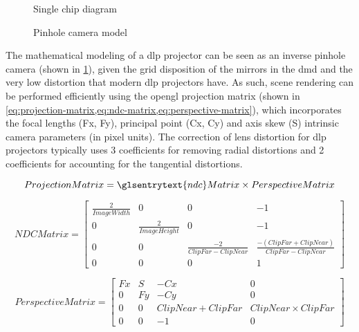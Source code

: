 \begin{figure}[H]
	\begin{floatrow}[2]
		{\caption[Single chip  diagram]{Single chip  diagram\protect\footnotemark}\label{fig:dlp-projector-diagram-dmd}}
		{\caption[Pinhole camera model]{Pinhole camera model\protect\footnotemark}\label{fig:camera-intrinsics}}
	\end{floatrow}
\end{figure}


The mathematical modeling of a \gls{dlp} projector can be seen as an inverse pinhole camera \cite{Hartley2003} (shown in \cref{fig:camera-intrinsics}), given the grid disposition of the mirrors in the \gls{dmd} and the very low distortion that modern \gls{dlp} projectors have. As such, scene rendering can be performed efficiently using the \gls{opengl} projection matrix (shown in \cref{eq:projection-matrix,eq:ndc-matrix,eq:perspective-matrix}), which incorporates the focal lengths (Fx, Fy), principal point (Cx, Cy) and axis skew (S) intrinsic camera parameters (in pixel units). The correction of lens distortion for \gls{dlp} projectors typically uses 3 coefficients for removing radial distortions and 2 coefficients for accounting for the tangential distortions.

{
	\scriptsize
	\begin{equation}\label{eq:projection-matrix}
	ProjectionMatrix = \glsentrytext{ndc}Matrix \times PerspectiveMatrix
	\end{equation}
	
	\begin{equation}\label{eq:ndc-matrix}
	NDCMatrix = 
	\begin{bmatrix}
	\frac{2}{ImageWidth} & 0 & 0 & -1 \\
	0 & \frac{2}{ImageHeight} & 0 & -1 \\
	0 & 0 & \frac{-2}{ClipFar - ClipNear} & \frac{-(ClipFar + ClipNear)}{ClipFar - ClipNear} \\
	0 & 0 & 0 & 1
	\end{bmatrix}
	\end{equation}
	
	
	\begin{equation}\label{eq:perspective-matrix}
	PerspectiveMatrix = 
	\begin{bmatrix}
	Fx & S & -Cx & 0 \\
	0 & Fy & -Cy & 0 \\
	0 & 0 & ClipNear + ClipFar & ClipNear \times ClipFar \\
	0 & 0 & -1 & 0
	\end{bmatrix}
	\end{equation}
}


